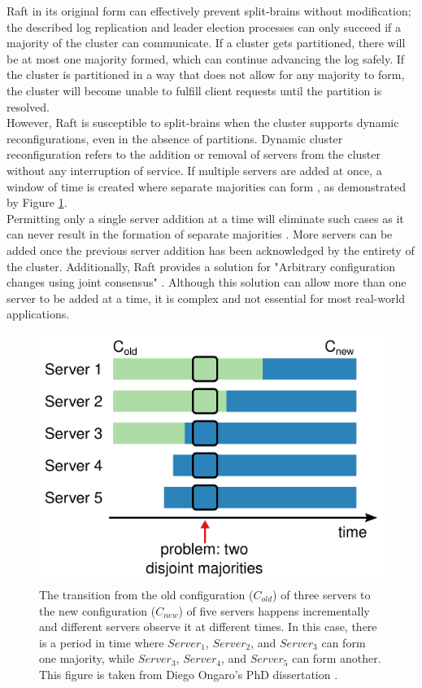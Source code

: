 Raft in its original form can effectively prevent split-brains without modification; the described log replication and leader election processes can only succeed if a majority of the cluster can communicate. If a cluster gets partitioned, there will be at most one majority formed, which can continue advancing the log safely. If the cluster is partitioned in a way that does not allow for any majority to form, the cluster will become unable to fulfill client requests until the partition is resolved.\\

However, Raft is susceptible to split-brains when the cluster supports dynamic reconfigurations, even in the absence of partitions. Dynamic cluster reconfiguration refers to the addition or removal of servers from the cluster without any interruption of service. If multiple servers are added at once, a window of time is created where separate majorities can form \cite{raft}, as demonstrated by Figure \ref{fig:reconfiguration-difficulty}.\\ 

Permitting only a single server addition at a time will eliminate such cases as it can never result in the formation of separate majorities \cite{raft}. More servers can be added once the previous server addition has been acknowledged by the entirety of the cluster. Additionally, Raft provides a solution for "Arbitrary configuration changes using joint consensus" \cite{raft}. Although this solution can allow more than one server to be added at a time, it is complex and not essential for most real-world applications.


\begin{figure}[ht]
  \centering
  \includegraphics[width=400pt]{images/reconfigurationdifficulty.png}
  \caption{The transition from the old configuration ($C_{old}$) of three servers to the new configuration ($C_{new}$) of five servers happens incrementally and different servers observe it at different times. In this case, there is a period in time where $Server_1$, $Server_2$, and $Server_3$ can form one majority, while $Server_3$, $Server_4$, and $Server_5$ can form another. This figure is taken from Diego Ongaro's PhD dissertation \cite{raft}.}
  \label{fig:reconfiguration-difficulty}
\end{figure}

